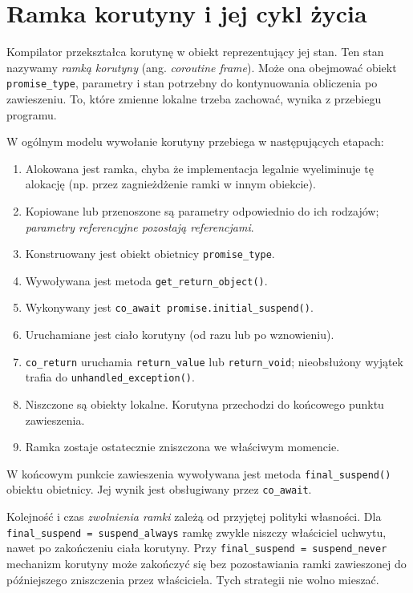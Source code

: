 \section{Ramka korutyny i jej cykl życia}
\label{sec:cpp15-frame}

Kompilator przekształca korutynę w obiekt reprezentujący jej stan.
Ten stan nazywamy \emph{ramką korutyny} (ang. \emph{coroutine frame}).
Może ona obejmować obiekt \texttt{promise\_type}, parametry i stan
potrzebny do kontynuowania obliczenia po zawieszeniu. To, które
zmienne lokalne trzeba zachować, wynika z przebiegu programu.

W ogólnym modelu wywołanie korutyny przebiega w następujących etapach:
\begin{enumerate}
\item Alokowana jest ramka, chyba że implementacja legalnie
      wyeliminuje tę alokację (np. przez zagnieżdżenie ramki w innym obiekcie).
\item Kopiowane lub przenoszone są parametry odpowiednio do ich rodzajów;
      \emph{parametry referencyjne pozostają referencjami}.
\item Konstruowany jest obiekt obietnicy \texttt{promise\_type}.
\item Wywoływana jest metoda \texttt{get\_return\_object()}.
\item Wykonywany jest \texttt{co\_await promise.initial\_suspend()}.
\item Uruchamiane jest ciało korutyny (od razu lub po wznowieniu).
\item \texttt{co\_return} uruchamia \texttt{return\_value} lub
      \texttt{return\_void}; nieobsłużony wyjątek trafia do
      \texttt{unhandled\_exception()}.
\item Niszczone są obiekty lokalne. Korutyna przechodzi do końcowego
      punktu zawieszenia.
\item Ramka zostaje ostatecznie zniszczona we właściwym momencie.
\end{enumerate}

W końcowym punkcie zawieszenia wywoływana jest metoda
\texttt{final\_suspend()} obiektu obietnicy. Jej wynik jest obsługiwany
przez \texttt{co\_await}.

Kolejność i czas \emph{zwolnienia ramki} zależą od przyjętej polityki
własności. Dla \texttt{final\_suspend = suspend\_always} ramkę zwykle
niszczy właściciel uchwytu, nawet po zakończeniu ciała korutyny.
Przy \texttt{final\_suspend = suspend\_never} mechanizm korutyny
może zakończyć się bez pozostawiania ramki zawieszonej do późniejszego
zniszczenia przez właściciela. Tych strategii nie wolno mieszać.

